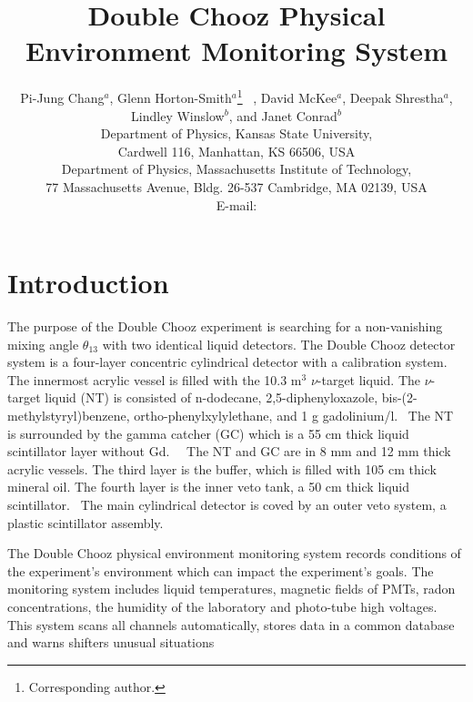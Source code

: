 \documentclass{JINST}
\title{Double Chooz Physical Environment Monitoring System}
\author{Pi-Jung Chang$^a$, Glenn Horton-Smith$^a$\thanks{Corresponding
author.}~ , David McKee$^a$, Deepak Shrestha$^a$, Lindley Winslow$^b$, and Janet Conrad$^b$ \\
\llap{$^a$}Department of Physics, Kansas State University,\\
  Cardwell 116, Manhattan, KS 66506, USA\\
\llap{$^b$}Department of Physics, Massachusetts Institute of Technology,\\
  77 Massachusetts Avenue, Bldg. 26-537 Cambridge, MA 02139, USA\\
  E-mail: \email{gahs@phys.ksu.edu}}
\begin{document}
\section{Introduction}
 The purpose of the Double Chooz experiment is searching for a non-vanishing mixing angle $\theta_{13}$ with two identical liquid detectors.
The Double Chooz detector system is a four-layer concentric cylindrical detector with a calibration system. The innermost acrylic vessel is filled with the 10.3 m$^{3}$ $\nu$-target liquid. The $\nu$-target liquid (NT) is consisted of n-dodecane, 2,5-diphenyloxazole, bis-(2-methylstyryl)benzene, ortho-phenylxylylethane, and 1 g gadolinium/l.~\cite{bib1}  The NT is surrounded by the gamma catcher (GC) which is a 55 cm thick liquid scintillator layer without Gd.~\cite{bib2}~\cite{bib1a} The NT and GC are in 8 mm and 12 mm thick acrylic vessels.
The third layer is the buffer, which is filled with 105 cm thick mineral oil. The fourth layer is the inner veto tank, a 50 cm thick liquid scintillator.~\cite{bib1}  The main cylindrical detector is coved by an outer veto system, a plastic scintillator assembly.~\cite{bib2}~\cite{bib1a}




The Double Chooz physical environment monitoring system records conditions of the experiment's environment which can impact the experiment\textquoteright s goals. The monitoring system includes liquid temperatures, magnetic fields of PMTs, radon concentrations, the humidity of the laboratory and photo-tube high voltages. This system scans all channels automatically, stores data in a common database and warns shifters unusual situations\cite{bib3}
\end{document}
